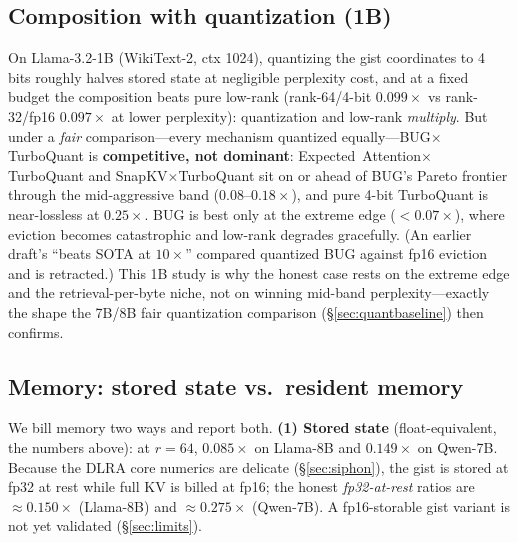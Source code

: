 \documentclass[11pt]{article}
\begin{document}
\subsection{Composition with quantization (1B)}
\label{sec:frontier}
On Llama-3.2-1B (WikiText-2, ctx 1024), quantizing the gist coordinates to 4 bits
roughly halves stored state at negligible perplexity cost, and at a fixed budget
the composition beats pure low-rank (rank-64/4-bit $0.099\times$ vs rank-32/fp16
$0.097\times$ at lower perplexity): quantization and low-rank \emph{multiply}. But
under a \emph{fair} comparison---every mechanism quantized equally---BUG$\times$
TurboQuant is \textbf{competitive, not dominant}: Expected~Attention$\times$
TurboQuant and SnapKV$\times$TurboQuant sit on or ahead of BUG's Pareto frontier
through the mid-aggressive band ($0.08$--$0.18\times$), and pure 4-bit TurboQuant
is near-lossless at $0.25\times$. BUG is best only at the extreme edge
($<0.07\times$), where eviction becomes catastrophic and low-rank degrades
gracefully. (An earlier draft's ``beats SOTA at $10\times$'' compared quantized
BUG against fp16 eviction and is retracted.) This 1B study is why the honest
case rests on the extreme edge and the retrieval-per-byte niche, not on winning
mid-band perplexity---exactly the shape the 7B/8B fair quantization comparison
(\S\ref{sec:quantbaseline}) then confirms.

\subsection{Memory: stored state vs.\ resident memory}
\label{sec:memory}
We bill memory two ways and report both.
\textbf{(1) Stored state} (float-equivalent, the numbers above): at $r{=}64$,
$0.085\times$ on Llama-8B and $0.149\times$ on Qwen-7B. Because the DLRA core
numerics are delicate (\S\ref{sec:siphon}), the gist is stored at fp32 at rest
while full KV is billed at fp16; the honest \emph{fp32-at-rest} ratios are
$\approx0.150\times$ (Llama-8B) and $\approx0.275\times$ (Qwen-7B). A
fp16-storable gist variant is not yet validated (\S\ref{sec:limits}).
\end{document}
